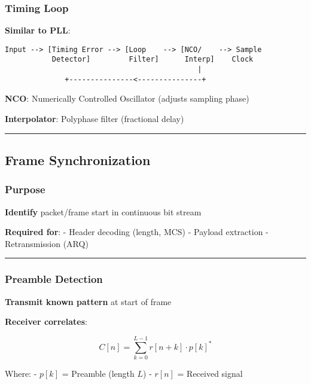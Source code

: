 \subsubsection{Timing Loop}\label{timing-loop}

\textbf{Similar to PLL}:

\begin{verbatim}
Input --> [Timing Error --> [Loop    --> [NCO/    --> Sample
           Detector]         Filter]      Interp]    Clock
                                             |
              +---------------<---------------+
\end{verbatim}

\textbf{NCO}: Numerically Controlled Oscillator (adjusts sampling phase)

\textbf{Interpolator}: Polyphase filter (fractional delay)

\begin{center}\rule{0.5\linewidth}{0.5pt}\end{center}

\subsection{Frame Synchronization}\label{frame-synchronization}

\subsubsection{Purpose}\label{purpose}

\textbf{Identify} packet/frame start in continuous bit stream

\textbf{Required for}: - Header decoding (length, MCS) - Payload
extraction - Retransmission (ARQ)

\begin{center}\rule{0.5\linewidth}{0.5pt}\end{center}

\subsubsection{Preamble Detection}\label{preamble-detection}

\textbf{Transmit known pattern} at start of frame

\textbf{Receiver correlates}:

\[
C[n] = \sum_{k=0}^{L-1} r[n+k] \cdot p[k]^*
\]

Where: - \(p[k]\) = Preamble (length \(L\)) - \(r[n]\) = Received signal

